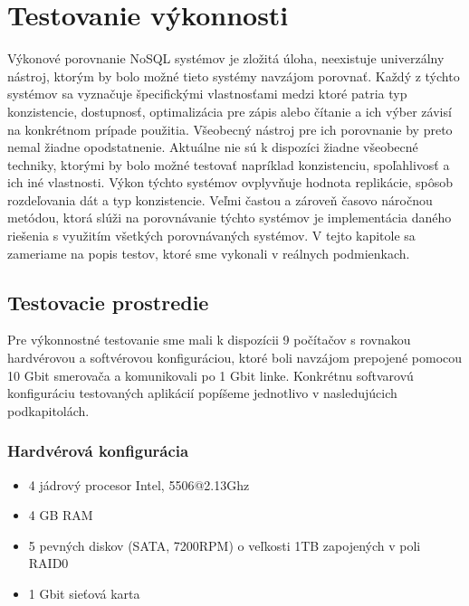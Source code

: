 \documentclass[11pt,twoside,a4paper]{book}
\begin{document}
\chapter{Testovanie výkonnosti}

Výkonové porovnanie NoSQL systémov je zložitá úloha, neexistuje univerzálny nástroj, ktorým by bolo možné tieto systémy navzájom porovnať. 
Každý z týchto systémov sa vyznačuje špecifickými vlastnosťami medzi ktoré patria typ konzistencie, dostupnosť, optimalizácia pre zápis alebo čítanie a ich výber závisí na konkrétnom prípade použitia. Všeobecný nástroj pre ich porovnanie by preto nemal žiadne opodstatnenie. Aktuálne nie sú k dispozíci žiadne všeobecné techniky, ktorými by bolo možné testovať napríklad konzistenciu, spoľahlivosť a ich iné vlastnosti. Výkon týchto systémov ovplyvňuje hodnota replikácie, spôsob rozdeľovania dát a typ konzistencie. Veľmi častou a zároveň časovo náročnou metódou, ktorá slúži na porovnávanie týchto systémov je implementácia daného riešenia s využitím všetkých porovnávaných systémov. V tejto kapitole sa zameriame na popis testov, ktoré sme vykonali v reálnych podmienkach.



\section{Testovacie prostredie}

Pre výkonnostné testovanie sme mali k dispozícii 9 počítačov s rovnakou hardvérovou a softvérovou konfiguráciou, ktoré boli navzájom prepojené pomocou 10 Gbit smerovača a komunikovali po 1 Gbit linke. Konkrétnu softvarovú konfiguráciu testovaných aplikácií popíšeme jednotlivo v nasledujúcich podkapitolách.

\subsection*{Hardvérová konfigurácia}
\begin{itemize}
 \item 4 jádrový procesor Intel, 5506@2.13Ghz
 \item 4 GB RAM
 \item 5 pevných diskov (SATA, 7200RPM) o veľkosti 1TB zapojených v poli RAID0
 \item 1 Gbit sieťová karta
\end{itemize}
\end{document}

